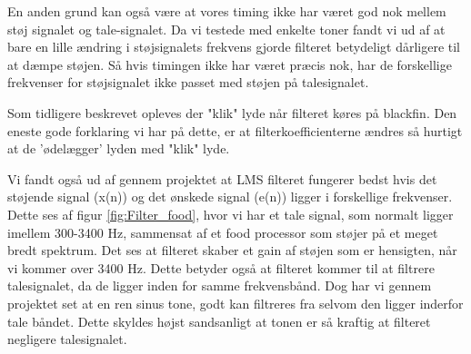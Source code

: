 \begin{description}[align=left]
En anden grund kan også være at vores timing ikke har været god nok mellem støj signalet og tale-signalet. Da vi testede med enkelte toner fandt vi ud af at bare en lille ændring i støjsignalets frekvens gjorde filteret betydeligt dårligere til at dæmpe støjen. Så hvis timingen ikke har været præcis nok, har de forskellige frekvenser for støjsignalet ikke passet med støjen på talesignalet.
\item ["klik" lyde.] Som tidligere beskrevet opleves der "klik" lyde når filteret køres på blackfin. Den eneste gode forklaring vi har på dette, er at filterkoefficienterne ændres så hurtigt at de 'ødelægger' lyden med "klik" lyde. 
\item [Bedst udenfor 300-3400 Hz.] Vi fandt også ud af gennem projektet at LMS filteret fungerer bedst hvis det støjende signal (x(n)) og det ønskede signal (e(n)) ligger i forskellige frekvenser. Dette ses af figur \ref{fig:Filter_food}, hvor vi har et tale signal, som normalt ligger imellem 300-3400 Hz, sammensat af et food processor som støjer på et meget bredt spektrum. Det ses at filteret skaber et gain af støjen som er hensigten, når vi kommer over 3400 Hz. Dette betyder også at filteret kommer til at filtrere talesignalet, da de ligger inden for samme frekvensbånd. Dog har vi gennem projektet set at en ren sinus tone, godt kan filtreres fra selvom den ligger inderfor tale båndet. Dette skyldes højst sandsanligt at tonen er så kraftig at filteret negligere talesignalet. 
\end{description}